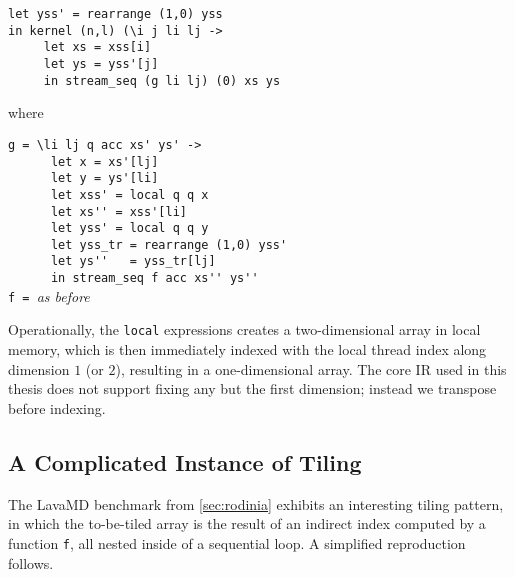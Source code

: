 \begin{lstlisting}
let yss' = rearrange (1,0) yss
in kernel (n,l) (\i j li lj ->
     let xs = xss[i]
     let ys = yss'[j]
     in stream_seq (g li lj) (0) xs ys
\end{lstlisting}
\begin{minipage}[t]{0.1\linewidth}
  \begin{flushright}
    where
  \end{flushright}
\end{minipage}
\begin{minipage}[t]{0.8\linewidth}
\lstinline{g = \li lj q acc xs' ys' ->}\\
\lstinline{      let x = xs'[lj]} \\
\lstinline{      let y = ys'[li]} \\
\lstinline{      let xss' = local q q x}\\
\lstinline{      let xs'' = xss'[li]}\\
\lstinline{      let yss' = local q q y}\\
\lstinline{      let yss_tr = rearrange (1,0) yss'}\\
\lstinline{      let ys''   = yss_tr[lj]}\\
\lstinline{      in stream_seq f acc xs'' ys''}\\
\lstinline{f = }\textit{as before}
\end{minipage}
\vspace{1em}

Operationally, the \lstinline{local} expressions creates a
two-dimensional array in local memory, which is then immediately
indexed with the local thread index along dimension $1$ (or $2$),
resulting in a one-dimensional array.  The core IR used in this thesis
does not support fixing any but the first dimension; instead we
transpose before indexing.

\subsection{A Complicated Instance of Tiling}
\label{sec:lavamd-tiling}

The LavaMD benchmark from \cref{sec:rodinia} exhibits an interesting
tiling pattern, in which the to-be-tiled array is the result of an
indirect index computed by a function \texttt{f}, all nested inside of
a sequential loop.  A simplified reproduction follows.

